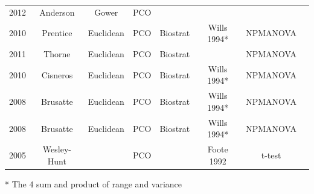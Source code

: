 \documentclass[12pt,letterpaper]{article}
\begin{document}
\begin{table}[ht]
\begin{tabular}{cccccccc}
    2012 & Anderson    & Gower     & PCO        &            &             &            & \cite{anderson2012using} \\
    2010 & Prentice    & Euclidean & PCO        & Biostrat   & Wills 1994* & NPMANOVA   & \cite{prentice2011} \\
    2011 & Thorne      & Euclidean & PCO        & Biostrat   &             & NPMANOVA   & \cite{thorneresetting2011} \\
    2010 & Cisneros    & Euclidean & PCO        & Biostrat   & Wills 1994* & NPMANOVA   & \cite{cisneros2010} \\
    2008 & Brusatte    & Euclidean & PCO        & Biostrat   & Wills 1994* & NPMANOVA   & \cite{brusatte50} \\
    2008 & Brusatte    & Euclidean & PCO        & Biostrat   & Wills 1994* & NPMANOVA   & \cite{Brusatte12092008} \\
    2005 & Wesley-Hunt &           & PCO        &            & Foote 1992  & t-test     & \cite{Wesley-Hunt2005} \\
  \hline
\end{tabular}
\end{table}
* The 4 sum and product of range and variance
\end{document}
